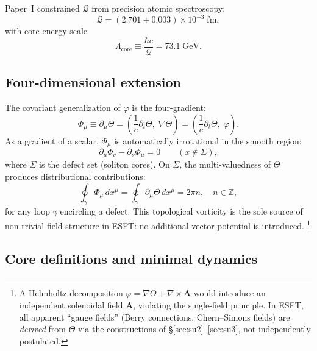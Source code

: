 \documentclass[a4paper,12pt]{article}
\newcommand{\Qoppa}{\mathcal{Q}} %
\newcommand{\qoppa}{\Qoppa} %
\begin{document}
Paper~I constrained $\qoppa$ from precision atomic spectroscopy:
\begin{equation}
\label{eq:avalue}
 \qoppa = (2.701 \pm 0.003) \times 10^{-3}\;\mathrm{fm},
\end{equation}
with core energy scale
\begin{equation}
\label{eq:avalue2}
 \Lambda_{\mathrm{core}} \equiv \frac{\hbar c}{\qoppa}
 = 73.1\;\mathrm{GeV}.
\end{equation}

\subsection{Four-dimensional extension}

The covariant generalization of $\varphi$ is the four-gradient:
\begin{equation}
\label{eq:4grad}
 \Phi_\mu \equiv \partial_\mu \Theta
 = \left(\frac{1}{c}\partial_t\Theta,\;\nabla\Theta\right)
 = \left(\frac{1}{c}\partial_t\Theta,\;\varphi\right).
\end{equation}
As a gradient of a scalar, $\Phi_\mu$ is automatically irrotational
in the smooth region:
\begin{equation}
\label{eq:irrot}
 \partial_\mu \Phi_\nu - \partial_\nu \Phi_\mu = 0
 \qquad (x \notin \Sigma),
\end{equation}
where $\Sigma$ is the defect set (soliton cores). On $\Sigma$,
the multi-valuedness of $\Theta$ produces distributional contributions:
\begin{equation}
\label{eq:vorticity}
 \oint_\gamma \Phi_\mu\,dx^\mu
 = \oint_\gamma \partial_\mu\Theta\,dx^\mu = 2\pi n,
 \quad n \in \mathbb{Z},
\end{equation}
for any loop $\gamma$ encircling a defect. This topological
vorticity is the sole source of non-trivial field structure in ESFT:
no additional vector potential is introduced.%
\footnote{A Helmholtz decomposition
$\varphi = \nabla\Theta + \nabla\times\mathbf{A}$ would introduce
an independent solenoidal field $\mathbf{A}$, violating the
single-field principle. In ESFT, all apparent ``gauge fields''
(Berry connections, Chern--Simons fields) are \emph{derived}
from $\Theta$ via the constructions of §\ref{sec:su2}--\ref{sec:su3},
not independently postulated.}

\subsection{Core definitions and minimal dynamics}
\end{document}
